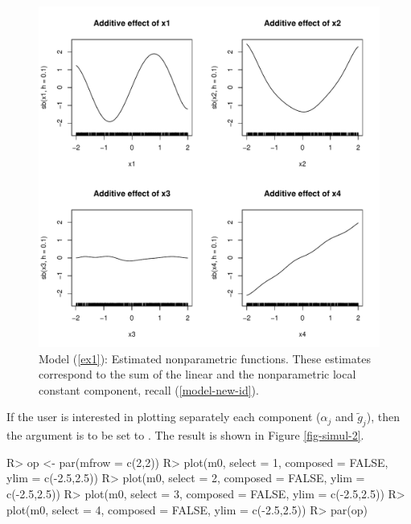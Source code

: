 \begin{figure}[htb]
	\vspace{-0.5cm}
\centering 
\includegraphics[width=14cm]{Gaussian_Plot_1.pdf} \vspace{-0.75cm}
\caption{Model (\ref{ex1}): Estimated nonparametric functions. These estimates correspond to the sum of the linear and the nonparametric local constant component, recall (\ref{model-new-id}).
\label{fig-simul} }
\end{figure}

If the user is interested in plotting separately each component ($\alpha_j$ and $\tilde g_j$), then the argument   is to be set to  . The result is shown in Figure \ref{fig-simul-2}.

\begin{Schunk}
\begin{Sinput}
R> op <- par(mfrow = c(2,2))
R> plot(m0, select = 1, composed = FALSE, ylim = c(-2.5,2.5))
R> plot(m0, select = 2, composed = FALSE, ylim = c(-2.5,2.5))
R> plot(m0, select = 3, composed = FALSE, ylim = c(-2.5,2.5))
R> plot(m0, select = 4, composed = FALSE, ylim = c(-2.5,2.5))
R> par(op)
\end{Sinput}
\end{Schunk}

